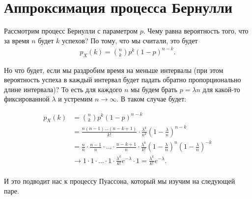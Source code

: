 \documentclass[12pt]{article}
\begin{document}
\section{Аппроксимация процесса Бернулли}

Рассмотрим процесс Бернулли с параметром $p$. Чему равна вероятность того, что за время $n$ будет $k$ успехов? По тому, что мы считали, это будет 
\begin{align*}
  p_X(k) = \binom{n}{k} p^k (1 - p)^{n - k}.
\end{align*}

Но что будет, если мы раздробим время на меньше интервалы (при этом вероятность успеха в каждый интервал будет падать обратно пропорционально длине интервала)? То есть для каждого $n$ мы будем брать $p = {\lambda}{n}$ для какой-то фиксированной $\lambda$ и устремим $n \to \infty$. В таком случае будет:

\begin{align*}
  p_X(k) &= \binom{n}{k} p^k (1 - p)^{n - k} \\
         &= \frac{n(n - 1)\dots(n - k+ 1)}{k!} \cdot \frac{\lambda^k}{n^k} \left(1 - \frac{\lambda}{n}\right)^{n - k} \\
         &= \frac{n}{n} \cdot \frac{n - 1}{n} \cdot \ldots \cdot \frac{n - k + 1}{n} \cdot \frac{\lambda^k}{k!} \left(1 - \frac{\lambda}{n}\right)^n \left(1 - \frac{\lambda}{n}\right)^{-k} \\
         &\to 1 \cdot 1 \cdot \ldots \cdot 1 \cdot \frac{\lambda^k}{k!}e^{-\lambda} \cdot 1 = \frac{\lambda^k}{k!}e^{-\lambda}.\\
\end{align*}

И это подводит нас к процессу Пуассона, который мы изучим на следующей паре.
\end{document}
